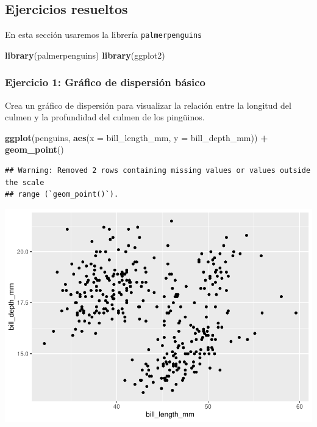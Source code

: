 \documentclass[
]{book}
\newenvironment{Shaded}{\begin{snugshade}}{\end{snugshade}}
\newcommand{\AttributeTok}[1]{\textcolor[rgb]{0.13,0.29,0.53}{#1}}
\newcommand{\FunctionTok}[1]{\textcolor[rgb]{0.13,0.29,0.53}{\textbf{#1}}}
\newcommand{\NormalTok}[1]{#1}
\newcommand{\SpecialCharTok}[1]{\textcolor[rgb]{0.81,0.36,0.00}{\textbf{#1}}}
\begin{document}
\subsection{Ejercicios resueltos}\label{ejercicios-resueltos}

En esta sección usaremos la librería \texttt{palmerpenguins}

\begin{Shaded}
\begin{Highlighting}[]
\FunctionTok{library}\NormalTok{(palmerpenguins)}
\FunctionTok{library}\NormalTok{(ggplot2)}
\end{Highlighting}
\end{Shaded}

\subsubsection{Ejercicio 1: Gráfico de dispersión básico}\label{ejercicio-1-gruxe1fico-de-dispersiuxf3n-buxe1sico}

Crea un gráfico de dispersión para visualizar la relación entre la longitud del culmen y la profundidad del culmen de los pingüinos.

\begin{Shaded}
\begin{Highlighting}[]
\FunctionTok{ggplot}\NormalTok{(penguins, }\FunctionTok{aes}\NormalTok{(}\AttributeTok{x =}\NormalTok{ bill\_length\_mm, }\AttributeTok{y =}\NormalTok{ bill\_depth\_mm)) }\SpecialCharTok{+}
  \FunctionTok{geom\_point}\NormalTok{()}
\end{Highlighting}
\end{Shaded}

\begin{verbatim}
## Warning: Removed 2 rows containing missing values or values outside the scale
## range (`geom_point()`).
\end{verbatim}

\includegraphics{bookdown-demo_files/figure-latex/unnamed-chunk-181-1.pdf}
\end{document}
